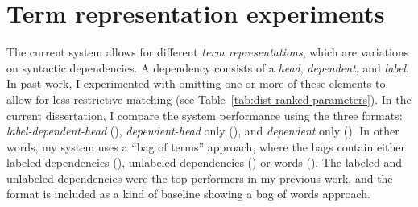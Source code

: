 \section{Term representation experiments}
\label{sec:exp-term-reps}
The current system allows for different \textit{term representations}, which are variations on syntactic dependencies. A dependency consists of a \textit{head}, \textit{dependent}, and \textit{label}. In past work, I experimented with omitting one or more of these elements to allow for less restrictive matching (see Table~\ref{tab:dist-ranked-parameters}). In the current dissertation, I compare the system performance using the three formats: \textit{label-dependent-head} (), \textit{dependent-head} only (), and \textit{dependent} only (). In other words, my system uses a ``bag of terms'' approach, where the bags contain either labeled dependencies (), unlabeled dependencies () or words (). The labeled and unlabeled dependencies were the top performers in my previous work, and the  format is included as a kind of baseline showing a bag of words approach.

